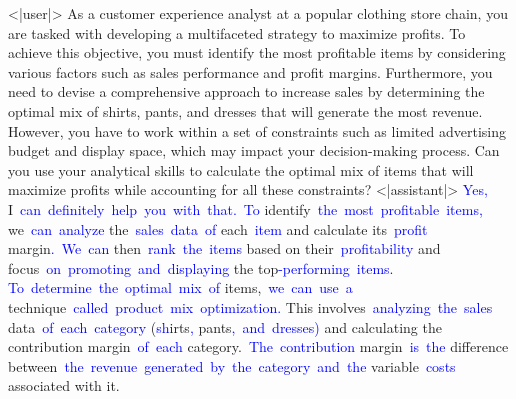 \documentclass{article}
\begin{document}
\begin{tcolorbox}[colframe=black,colback=white]
<|user|>
As a customer experience analyst at a popular clothing store chain, you are tasked with developing a multifaceted strategy to maximize profits. To achieve this objective, you must identify the most profitable items by considering various factors such as sales performance and profit margins. Furthermore, you need to devise a comprehensive approach to increase sales by determining the optimal mix of shirts, pants, and dresses that will generate the most revenue. However, you have to work within a set of constraints such as limited advertising budget and display space, which may impact your decision-making process. Can you use your analytical skills to calculate the optimal mix of items that will maximize profits while accounting for all these constraints?
<|assistant|>
\textcolor{blue}{Yes}\textcolor{blue}{,} I\textcolor{blue}{~can}\textcolor{blue}{~definitely}\textcolor{blue}{~help}\textcolor{blue}{~you}\textcolor{blue}{~with}\textcolor{blue}{~that}\textcolor{blue}{.}\textcolor{blue}{~To} identify\textcolor{blue}{~the}\textcolor{blue}{~most}\textcolor{blue}{~profitable}\textcolor{blue}{~items}\textcolor{blue}{,} we\textcolor{blue}{~can}\textcolor{blue}{~analyze} the\textcolor{blue}{~sales}\textcolor{blue}{~data}\textcolor{blue}{~of} each\textcolor{blue}{~item} and calculate its\textcolor{blue}{~profit} margin\textcolor{blue}{.}\textcolor{blue}{~We}\textcolor{blue}{~can} then\textcolor{blue}{~rank}\textcolor{blue}{~the}\textcolor{blue}{~items} based on their\textcolor{blue}{~profitability} and focus\textcolor{blue}{~on}\textcolor{blue}{~promoting}\textcolor{blue}{~and}\textcolor{blue}{~displaying} the top\textcolor{blue}{-per}\textcolor{blue}{forming}\textcolor{blue}{~items}.
\textcolor{blue}{To}\textcolor{blue}{~determine}\textcolor{blue}{~the}\textcolor{blue}{~optimal}\textcolor{blue}{~mix}\textcolor{blue}{~of} items,\textcolor{blue}{~we}\textcolor{blue}{~can}\textcolor{blue}{~use}\textcolor{blue}{~a} technique\textcolor{blue}{~called}\textcolor{blue}{~product}\textcolor{blue}{~mix}\textcolor{blue}{~optimization}\textcolor{blue}{.} This involves\textcolor{blue}{~analyzing}\textcolor{blue}{~the}\textcolor{blue}{~sales} data\textcolor{blue}{~of}\textcolor{blue}{~each}\textcolor{blue}{~category} (\textcolor{blue}{sh}irts\textcolor{blue}{,} pants\textcolor{blue}{,}\textcolor{blue}{~and}\textcolor{blue}{~dresses}\textcolor{blue}{)} and calculating the contribution margin\textcolor{blue}{~of}\textcolor{blue}{~each} category.\textcolor{blue}{~The}\textcolor{blue}{~contribution} margin\textcolor{blue}{~is}\textcolor{blue}{~the} difference between\textcolor{blue}{~the}\textcolor{blue}{~revenue}\textcolor{blue}{~generated}\textcolor{blue}{~by}\textcolor{blue}{~the}\textcolor{blue}{~category}\textcolor{blue}{~and}\textcolor{blue}{~the} variable\textcolor{blue}{~costs} associated with it.\textcolor{blue}{~
}
\end{tcolorbox}
\end{document}
